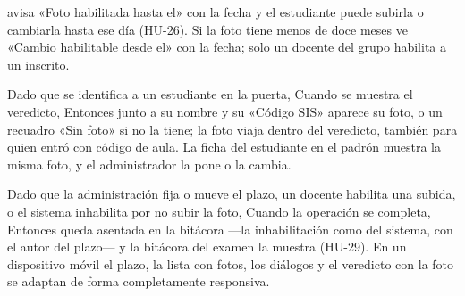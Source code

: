 {      avisa «Foto habilitada hasta el» con la fecha y el estudiante puede subirla o
      cambiarla hasta ese día (HU-26). Si la foto tiene menos de doce meses ve «Cambio
      habilitable desde el» con la fecha; solo un docente del grupo habilita a un
      inscrito.
\item Dado que se identifica a un estudiante en la puerta, Cuando se muestra el
      veredicto, Entonces junto a su nombre y su «Código SIS» aparece su foto, o un
      recuadro «Sin foto» si no la tiene; la foto viaja dentro del veredicto, también
      para quien entró con código de aula. La ficha del estudiante en el padrón muestra
      la misma foto, y el administrador la pone o la cambia.
\item Dado que la administración fija o mueve el plazo, un docente habilita una subida,
      o el sistema inhabilita por no subir la foto, Cuando la operación se completa,
      Entonces queda asentada en la bitácora ---la inhabilitación como del sistema, con
      el autor del plazo--- y la bitácora del examen la muestra (HU-29). En un
      dispositivo móvil el plazo, la lista con fotos, los diálogos y el veredicto con la
      foto se adaptan de forma completamente responsiva.}

\def\HUMockupsPares{%
\CajaMockup{hu27-plazo-de-fotos}{10.6cm} & \CajaMockup{hu27-plazo-de-fotos-movil}{3.2cm} \\[4pt]
\hline
\CajaMockup{hu27-fotos-en-la-habilitacion}{10.6cm} & \CajaMockup{hu27-fotos-en-la-habilitacion-movil}{3.2cm} \\[4pt]
\hline
\CajaMockup{hu27-habilitar-cambio-de-foto}{10.6cm} & \CajaMockup{hu27-habilitar-cambio-de-foto-movil}{3.2cm} \\[4pt]
\hline
\CajaMockup{hu27-habilitacion-sin-foto}{10.6cm} & \CajaMockup{hu27-habilitacion-sin-foto-movil}{3.2cm} \\[4pt]
\hline
\CajaMockup{hu27-puerta-sin-foto}{10.6cm} & \CajaMockup{hu27-puerta-sin-foto-movil}{3.2cm} \\[4pt]
\hline}


